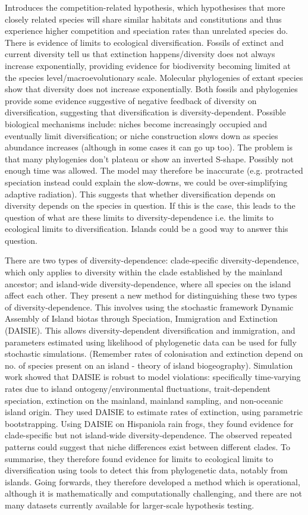 \documentclass[9pt]{article}
\begin{document}
	Introduces the competition-related hypothesis, which hypothesises that more closely related species will share similar habitats and constitutions and thus experience higher competition and speciation rates than unrelated species do. There is evidence of limits to ecological diversification. Fossils of extinct and current diversity tell us that extinction happens/diversity does not always increase exponentially, providing evidence for biodiversity becoming limited at the species level/macroevolutionary scale. Molecular phylogenies of extant species show that diversity does not increase exponentially. Both fossils and phylogenies provide some evidence suggestive of negative feedback of diversity on diversification, suggesting that diversification is diversity-dependent. Possible biological mechanisms include: niches become increasingly occupied and eventually limit diversification; or niche construction slows down as species abundance increases (although in some cases it can go up too). The problem is that many phylogenies don't plateau or show an inverted S-shape. Possibly not enough time was allowed. The model may therefore be inaccurate (e.g. protracted speciation instead could explain the slow-downs, we could be over-simplifying adaptive radiation). This suggests that whether diversification depends on diversity depends on the species in question. If this is the case, this leads to the question of what are these limits to diversity-dependence i.e. the limits to ecological limits to diversification. Islands could be a good way to answer this question. 
	
	There are two types of diversity-dependence: clade-specific diversity-dependence, which only applies to diversity within the clade established by the mainland ancestor; and island-wide diversity-dependence, where all species on the island affect each other. They present a new method for distinguishing these two types of diversity-dependence. This involves using the stochastic framework Dynamic Assembly of Island biotas through Speciation, Immigration and Extinction (DAISIE). This allows diversity-dependent diversification and immigration, and parameters estimated using likelihood of phylogenetic data can be used for fully stochastic simulations. (Remember rates of colonisation and extinction depend on no. of species present on an island - theory of island biogeography). Simulation work showed that DAISIE is robust to model violations: specifically time-varying rates due to island ontogeny/environmental fluctuations, trait-dependent speciation, extinction on the mainland, mainland sampling, and non-oceanic island origin. They used DAISIE to estimate rates of extinction, using parametric bootstrapping. Using DAISIE on Hispaniola rain frogs, they found evidence for clade-specific but not island-wide diversity-dependence. The observed repeated patterns could suggest that niche differences exist between different clades. To summarise, they therefore found evidence for limits to ecological limits to diversification using tools to detect this from phylogenetic data, notably from islands. Going forwards, they therefore developed a method which is operational, although it is mathematically and computationally challenging, and there are not many datasets currently available for larger-scale hypothesis testing.
\end{document}

